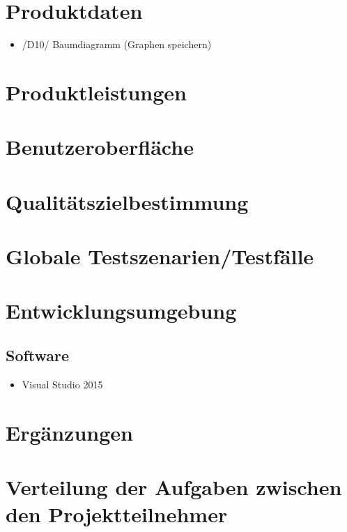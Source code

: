 \documentclass[a4paper,10pt]{report}
\begin{document}
\section{Produktdaten}
\begin{itemize}
\item /D10/ Baumdiagramm (Graphen speichern)
\end{itemize}
\section{Produktleistungen}
\section{Benutzeroberfläche}
\section{Qualitätszielbestimmung}

\section{Globale Testszenarien/Testfälle}
\section{Entwicklungsumgebung}
\subsection{Software}
\begin{itemize}
\item Visual Studio 2015
\end{itemize} 
\section{Ergänzungen}
\section{Verteilung der Aufgaben zwischen den Projektteilnehmer}
\end{document}
